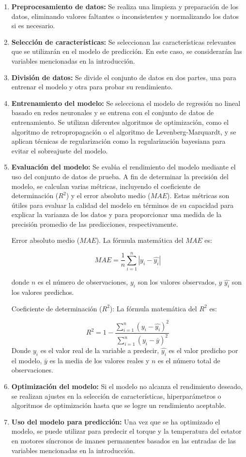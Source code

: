 \documentclass{article}
\begin{document}
\begin{enumerate}
\item \textbf{Preprocesamiento de datos:} Se realiza una limpieza y preparación de los datos, eliminando valores faltantes o inconsistentes y normalizando los datos si es necesario.
\item \textbf{Selección de características:} Se seleccionan las características relevantes que se utilizarán en el modelo de predicción. En este caso, se considerarán las variables mencionadas en la introducción.
\item \textbf{División de datos:} Se divide el conjunto de datos en dos partes, una para entrenar el modelo y otra para probar su rendimiento.
\item \textbf{Entrenamiento del modelo:} Se selecciona el modelo de regresión no lineal basado en redes neuronales y se entrena con el conjunto de datos de entrenamiento. Se utilizan diferentes algoritmos de optimización, como el algoritmo de retropropagación o el algoritmo de Levenberg-Marquardt, y se aplican técnicas de regularización como la regularización bayesiana para evitar el sobreajuste del modelo.
\item \textbf{Evaluación del modelo:} Se evalúa el rendimiento del modelo mediante el uso del conjunto de datos de prueba. A fin de determinar la precisión del modelo, se calculan varias métricas, incluyendo el coeficiente de determinación ($R^2$) y el error absoluto medio ($MAE$). Estas métricas son útiles para evaluar la calidad del modelo en términos de su capacidad para explicar la varianza de los datos y para proporcionar una medida de la precisión promedio de las predicciones, respectivamente.


Error absoluto medio ($MAE$). La fórmula matemática del $MAE$ es: 

$$MAE = \frac{1}{n}\sum_{i=1}^n |y_i - \hat{y_i}|$$

donde $n$ es el número de observaciones, $y_i$ son los valores observados, $y$ $\hat{y_i}$ son los valores predichos.





Coeficiente de determinación ($R^2$):
La fórmula matemática del $R^2$ es:

$$R^2 = 1 - \frac{\sum_{i=1}^{n}(y_i - \hat{y_i})^2}{\sum_{i=1}^{n}(y_i - \bar{y})^2}$$
Donde $y_i$ es el valor real de la variable a predecir, $\hat{y_i}$ es el valor predicho por el modelo, $\bar{y}$ es la media de los valores reales y $n$ es el número total de observaciones.




\item \textbf{Optimización del modelo:} Si el modelo no alcanza el rendimiento deseado, se realizan ajustes en la selección de características, hiperparámetros o algoritmos de optimización hasta que se logre un rendimiento aceptable.
\item \textbf{Uso del modelo para predicción:} Una vez que se ha optimizado el modelo, se puede utilizar para predecir el torque y la temperatura del estator en motores síncronos de imanes permanentes basados en las entradas de las variables mencionadas en la introducción.
\end{enumerate}
\end{document}
